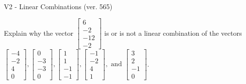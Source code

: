 \begin{exercise}
  \begin{exerciseTitle}V2 - Linear Combinations (ver. 565)\end{exerciseTitle}
  \begin{exerciseStatement}
    Explain why the vector \(\left[\begin{array}{c}
6 \\
-2 \\
-12 \\
-2
\end{array}\right]\)  is or is not a linear 
	combination of the vectors \(\left[\begin{array}{c}
-4 \\
-2 \\
4 \\
0
\end{array}\right] , \left[\begin{array}{c}
0 \\
-3 \\
-3 \\
0
\end{array}\right] , \left[\begin{array}{c}
1 \\
1 \\
-1 \\
-1
\end{array}\right] , \left[\begin{array}{c}
-1 \\
-2 \\
4 \\
1
\end{array}\right] , \text{ and } \left[\begin{array}{c}
3 \\
2 \\
-1 \\
0
\end{array}\right]\).
	



\end{exerciseStatement}
\end{exercise}
